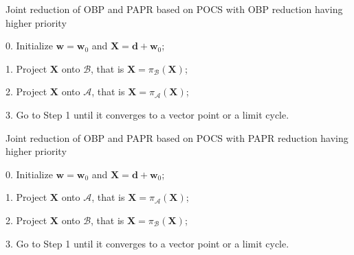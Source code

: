 \documentclass[paper]{ieice}
\begin{document}
\begin{algorithm}[t]
\caption{Joint reduction of OBP and PAPR based on POCS with OBP reduction having higher priority}\label{alg:POCS}
\begin{algorithmic}
\item[0.] Initialize $\mathbf{w} = \mathbf{w}_0$ and $\mathbf{X} = \mathbf{d} + \mathbf{w}_{0}$;
\item[1.] Project  $\mathbf{X}$  onto $\mathcal{B}$, that is $ \mathbf{X} = \pi_{\mathcal{B}}(\mathbf{X})$;
\item[2.] Project  $\mathbf{X}$  onto $\mathcal{A}$, that is $ \mathbf{X} = \pi_{\mathcal{A}}(\mathbf{X})$;
\item[3.] Go to Step 1 until it converges to a vector point or a limit cycle.
\end{algorithmic}
\end{algorithm}


\begin{algorithm}[t]
	\caption{Joint reduction of OBP and PAPR based on POCS with PAPR reduction having  higher priority }\label{alg:POCS2}
	\begin{algorithmic}
		\item[0.] Initialize $\mathbf{w} = \mathbf{w}_0$ and $\mathbf{X} = \mathbf{d} + \mathbf{w}_{0}$;
		\item[1.] Project  $\mathbf{X}$  onto $\mathcal{A}$, that is $ \mathbf{X} = \pi_{\mathcal{A}}(\mathbf{X})$;
		\item[2.] Project  $\mathbf{X}$  onto $\mathcal{B}$, that is $ \mathbf{X} = \pi_{\mathcal{B}}(\mathbf{X})$;
		\item[3.] Go to Step 1 until it converges to a vector point or a limit cycle.
	\end{algorithmic}
\end{algorithm}
\end{document}
